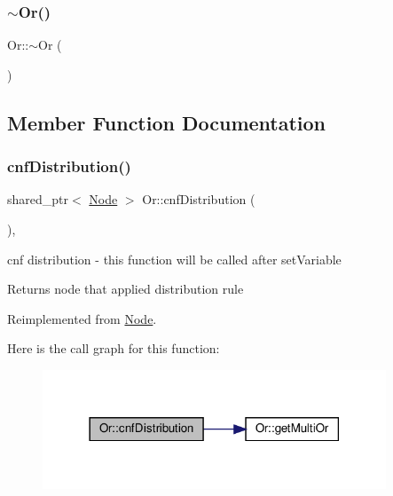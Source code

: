 \mbox{\label{class_or_aea3ecd177d77f4478464d2def9c5618b}} 
\subsubsection{\texorpdfstring{$\sim$\+Or()}{~Or()}}
{\footnotesize\ttfamily Or\+::$\sim$\+Or (\begin{DoxyParamCaption}{ }\end{DoxyParamCaption})\hspace{0.3cm}{\ttfamily [override]}}



\subsection{Member Function Documentation}
\mbox{\label{class_or_ae49bee04503f31d32750ecf8671e5552}} 
\subsubsection{\texorpdfstring{cnf\+Distribution()}{cnfDistribution()}}
{\footnotesize\ttfamily shared\+\_\+ptr$<$ \hyperlink{class_node}{Node} $>$ Or\+::cnf\+Distribution (\begin{DoxyParamCaption}{ }\end{DoxyParamCaption})\hspace{0.3cm}{\ttfamily [override]}, {\ttfamily [virtual]}}



cnf distribution -\/ this function will be called after set\+Variable 

\begin{DoxyReturn}{Returns}
node that applied distribution rule 
\end{DoxyReturn}


Reimplemented from \hyperlink{class_node_ae68e5138f0c1a6c79912e21bc8f39d48}{Node}.

Here is the call graph for this function\+:\nopagebreak
\begin{figure}[H]
\begin{center}
\leavevmode
\includegraphics[width=290pt]{d8/d1b/class_or_ae49bee04503f31d32750ecf8671e5552_cgraph}
\end{center}
\end{figure}
\mbox{\label{class_or_ad8a208aee185d567ede5c92f39796faa}} 
